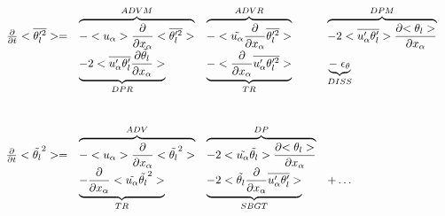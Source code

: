 \begin{displaymath}
\left.
\begin{array}{rllll}
\frac{\partial }{\partial t} <\overline{\theta_l'^2}> = & 
\overbrace{- <u_\alpha>\frac{\partial}{\partial x_\alpha} <\overline{\theta_l'^2}> }^{ADVM}  &
\overbrace{- <\tilde{u_\alpha}\frac{\partial}{\partial x_\alpha} \overline{\theta_l'^2} > }^{ADVR} &
\overbrace{- 2 <\overline{u_\alpha'\theta_l'}> \frac{\partial {<\theta_l>}}{\partial x_\alpha} }^{DPM} \\
\vspace*{1.0cm}
& \underbrace{- 2 <\overline{u'_\alpha \theta_l'} \frac{\partial {\tilde{\theta_l}}}{\partial x_\alpha}>}_{DPR}  &
 \underbrace{- <\frac{\partial}{\partial x_\alpha} \overline{u'_\alpha \theta_l'^2}>}_{TR}
 & \underbrace{-\; \epsilon_{\theta}}_{DISS}\\
\frac{\partial }{\partial t} <\tilde{\theta_l}^2> = & 
\overbrace{- <u_\alpha>\frac{\partial}{\partial x_\alpha} <\tilde{\theta_l}^2> }^{ADV} &
\overbrace{- 2<\tilde{u_\alpha} \tilde{\theta_l}> \frac{\partial {<\theta_l>}}{\partial x_\alpha}}^{DP} &\\
& \underbrace{- \frac{\partial}{\partial x_\alpha} <\tilde{u_\alpha} \tilde{\theta_l}^2>}_{TR} &
\underbrace{- 2 <\tilde{\theta_l}\frac{\partial}{\partial x_\alpha}\overline{u'_\alpha \theta_l'}>}_{SBGT} & + \ldots
\end{array}
\right.
\end{displaymath}

